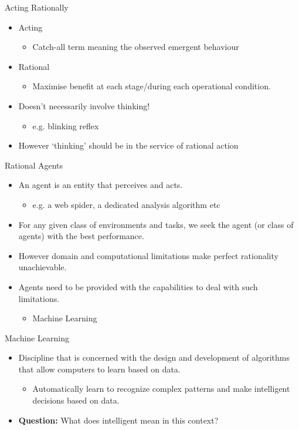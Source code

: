 \documentclass[%
pdf,
colorBG,
slideColor,
tcrico,
]{prosper}
\begin{document}
\begin{slide}{Acting Rationally}
\begin{itemize}
 \item Acting
	\begin{itemize}
	\item Catch-all term meaning the observed emergent behaviour 
	\end{itemize}
\item Rational
	\begin{itemize}
	\item Maximise benefit at each stage/during each operational condition.
	\end{itemize}
\item Doesn't necessarily involve thinking!
	\begin{itemize}
	\item e.g. blinking reflex 
	\end{itemize}
\item However ‘thinking’ should be in the service of rational action 
\end{itemize}
\end{slide}


\begin{slide}{Rational Agents}
\begin{itemize}
 \item An agent is an entity that perceives and acts.
	\begin{itemize}
	\item e.g. a web spider, a dedicated analysis algorithm etc
	\end{itemize}
\item For any given class of environments and tasks, we seek the agent (or class of agents) with the best performance.
\item However domain and computational limitations make perfect rationality unachievable.
\item Agents need to be provided with the capabilities to deal with such limitations.
	\begin{itemize}
	\item Machine Learning
	\end{itemize}
\end{itemize}
\end{slide}



\begin{slide}{Machine Learning}
\begin{itemize}
 \item Discipline that is concerned with the design and development of algorithms that allow computers to learn based on data.
	\begin{itemize}
	\item Automatically learn to recognize complex patterns and make intelligent decisions based on data.
	\end{itemize}
\item \textbf{Question:} What does intelligent mean in this context?
\end{itemize}
\end{slide}
\end{document}
